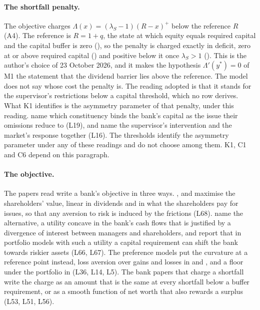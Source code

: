 \paragraph{The shortfall penalty.} The objective charges
$\Lambda(x)=(\lambda_S-1)(R-x)^+$ below the reference $R$ (A4). The reference
is $R=1+q$, the state at which equity equals required capital and the capital
buffer is zero (), so the penalty is
charged exactly in deficit, zero at or above required capital
() and positive below it
once $\lambda_S>1$ (). This is
the author's choice of 23 October 2026, and it makes the hypothesis
$\Lambda'(y^*)=0$ of M1 the statement that the dividend barrier lies above the
reference. The model does not say whose cost the penalty is. The reading adopted is that it stands for
the supervisor's restrictions below a capital threshold, which no row derives.
What K1 identifies is the asymmetry parameter of that penalty, under this
reading. \citet{peura2006} name which constituency binds the bank's capital
as the issue their omissions reduce to (L19), and \citet{milnewhalley2001}
name the supervisor's intervention and the market's response together (L16).
The thresholds identify the asymmetry parameter under any of these readings and do not
choose among them. K1, C1 and C6 depend on this paragraph.

\paragraph{The objective.} The papers read write a bank's objective in three
ways. \citet{peura2006}, \citet{milnewhalley2001} and \citet{bayraktar2026}
maximise the shareholders' value, linear in dividends and in what the
shareholders pay for issues, so that any aversion to risk is induced by the
frictions (L68). \citet{milnewhalley2001} name the alternative, a utility
concave in the bank's cash flows that is justified by a divergence of interest
between managers and shareholders, and report that in portfolio models with
such a utility a capital requirement can shift the bank towards riskier assets
(L66, L67). The preference models put the curvature at a reference point
instead, loss aversion over gains and losses in \citet{barberis2001} and
\citet{li2023}, and a floor under the portfolio in \citet{blackperold1992}
(L36, L14, L5). The bank papers that charge a shortfall write the charge as an
amount that is the same at every shortfall below a buffer requirement, or as a
smooth function of net worth that also rewards a surplus (L53, L51, L56).

